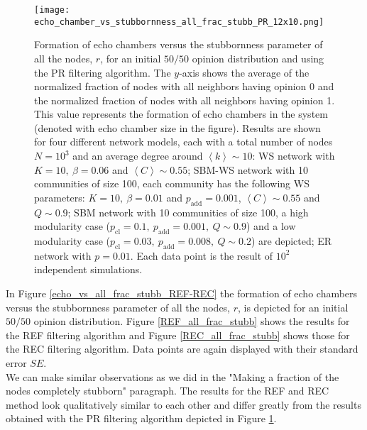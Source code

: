 \documentclass[11 pt , letterpaper , twoside , openright]{book}
\begin{document}
\begin{figure}[H]
	\texttt{[image: echo\_chamber\_vs\_stubbornness\_all\_frac\_stubb\_PR\_12x10.png]}
	\captionsetup{format=plain}
	\caption[Formation of echo chambers versus the stubbornness parameter of all the nodes, $r$, for the PR filtering algorithm and an initial $50/50$ opinion distribution]{Formation of echo chambers versus the stubbornness parameter of all the nodes, $r$, for an initial $50/50$ opinion distribution and using the PR filtering algorithm. The $y$-axis shows the average of the normalized fraction of nodes with all neighbors having opinion 0 and the normalized fraction of nodes with all neighbors having opinion 1. This value represents the formation of echo chambers in the system (denoted with echo chamber size in the figure). Results are shown for four different network models, each with a total number of nodes $N=10^3$ and an average degree around $\left<k\right> \sim 10$: WS network with $K =10,\ \beta = 0.06$ and $\left<C\right> \sim 0.55$; SBM-WS network with 10 communities of size 100, each community has the following WS parameters: $K = 10,\ \beta = 0.01$ and $p_{\text{add}} = 0.001$, $\left<C\right> \sim 0.55$ and $Q \sim 0.9$; SBM network with 10 communities of size 100, a high modularity case ($p_{\text{cl}} = 0.1,\ p_{\text{add}} = 0.001,\ Q \sim 0.9$) and a low modularity case ($p_{\text{cl}} = 0.03,\ p_{\text{add}} = 0.008,\ Q \sim 0.2$) are depicted; ER network with $p= 0.01$. Each data point is the result of $10^2$ independent simulations.}
\label{echo_vs_all_frac_stubb_PR}
\end{figure}
\newpage
\noindent
In Figure \ref{echo_vs_all_frac_stubb_REF-REC} the formation of echo chambers versus the stubbornness parameter of all the nodes, $r$, is depicted for an initial $50/50$ opinion distribution. Figure \ref{REF_all_frac_stubb} shows the results for the REF filtering algorithm and Figure \ref{REC_all_frac_stubb} shows those for the REC filtering algorithm. Data points are again displayed with their standard error $SE$.\\
We can make similar observations as we did in the "Making a fraction of the nodes completely stubborn" paragraph. The results for the REF and REC method look qualitatively similar to each other and differ greatly from the results obtained with the PR filtering algorithm depicted in Figure \ref{echo_vs_all_frac_stubb_PR}.\\
\end{document}
